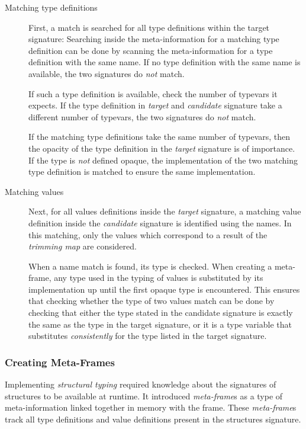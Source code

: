\begin{description}
\item[Matching type definitions]
First, a match is searched for all type definitions within the target signature:
Searching inside the meta-information for a matching type definition can be done by scanning the meta-information for a type definition with the same name.
If no type definition with the same name is available, the two signatures do \emph{not} match.

If such a type definition is available, check the number of typevars  it expects.
If the type definition in \emph{target} and \emph{candidate} signature take a different number of typevars, the two signatures do \emph{not} match.

If the matching type definitions take the same number of typevars, then the opacity of the type definition in the \emph{target} signature is of importance. If the type is \emph{not} defined opaque, the implementation of the two matching type definition is matched to ensure the same implementation.
\item[Matching values]
Next, for all values definitions inside the \emph{target} signature, a matching value definition inside the \emph{candidate} signature is identified using the names.
In this matching, only the values which correspond to a result of the \emph{trimming map} are considered.

When a name match is found, its type is checked.
When creating a meta-frame, any type used in the typing of values is substituted by its implementation up until the first opaque type is encountered.
This ensures that checking whether the type of two values match can be done by checking that either the type stated in the candidate signature is exactly the same as the type in the target signature, or it is a type variable that substitutes \emph{consistently} for the type listed in the target signature.
\end{description}

\subsubsection{Creating Meta-Frames}
Implementing \emph{structural typing} required knowledge about the signatures of structures to be available at runtime.
It introduced \emph{meta-frame}s as a type of meta-information linked together in memory with the frame.
These \emph{meta-frame}s track all type definitions and value definitions present in the structures signature.


